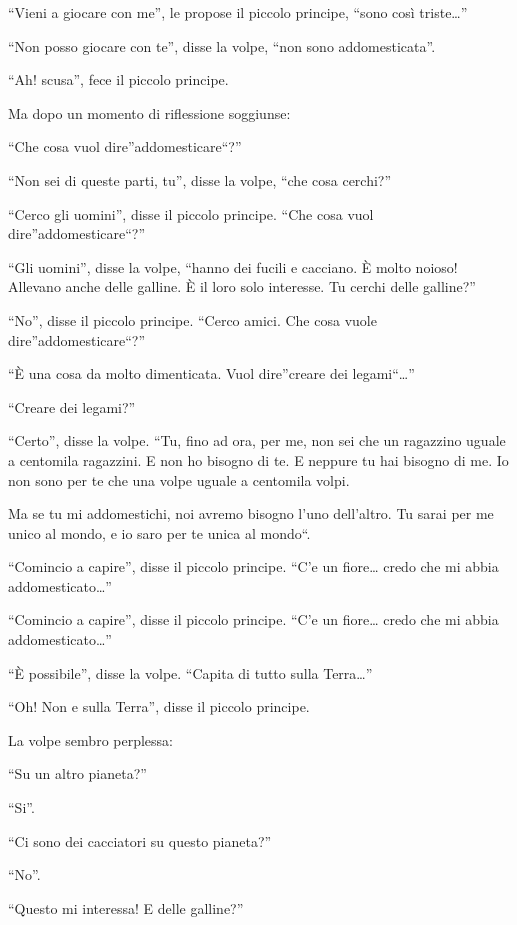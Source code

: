 \documentclass[11pt]{scrbook}
\begin{document}
``Vieni a giocare con me'', le propose il piccolo principe, ``sono così
triste\ldots{}''

``Non posso giocare con te'', disse la volpe, ``non sono
addomesticata''.

``Ah! scusa'', fece il piccolo principe.

Ma dopo un momento di riflessione soggiunse:

``Che cosa vuol dire''addomesticare``?''

``Non sei di queste parti, tu'', disse la volpe, ``che cosa cerchi?''

``Cerco gli uomini'', disse il piccolo principe. ``Che cosa vuol
dire''addomesticare``?''

``Gli uomini'', disse la volpe, ``hanno dei fucili e cacciano. È molto
noioso! Allevano anche delle galline. È il loro solo interesse. Tu
cerchi delle galline?''

``No'', disse il piccolo principe. ``Cerco amici. Che cosa vuole
dire''addomesticare``?''

``È una cosa da molto dimenticata. Vuol dire''creare dei
legami``\ldots{}''

``Creare dei legami?''

``Certo'', disse la volpe. ``Tu, fino ad ora, per me, non sei che un
ragazzino uguale a centomila ragazzini. E non ho bisogno di te. E
neppure tu hai bisogno di me. Io non sono per te che una volpe uguale a
centomila volpi.

Ma se tu mi addomestichi, noi avremo bisogno l'uno dell'altro. Tu sarai
per me unico al mondo, e io saro per te unica al mondo``.

``Comincio a capire'', disse il piccolo principe. ``C'e un fiore\ldots{}
credo che mi abbia addomesticato\ldots{}''

``Comincio a capire'', disse il piccolo principe. ``C'e un fiore\ldots{}
credo che mi abbia addomesticato\ldots{}''

``È possibile'', disse la volpe. ``Capita di tutto sulla Terra\ldots{}''

``Oh! Non e sulla Terra'', disse il piccolo principe.

La volpe sembro perplessa:

``Su un altro pianeta?''

``Si''.

``Ci sono dei cacciatori su questo pianeta?''

``No''.

``Questo mi interessa! E delle galline?''
\end{document}
